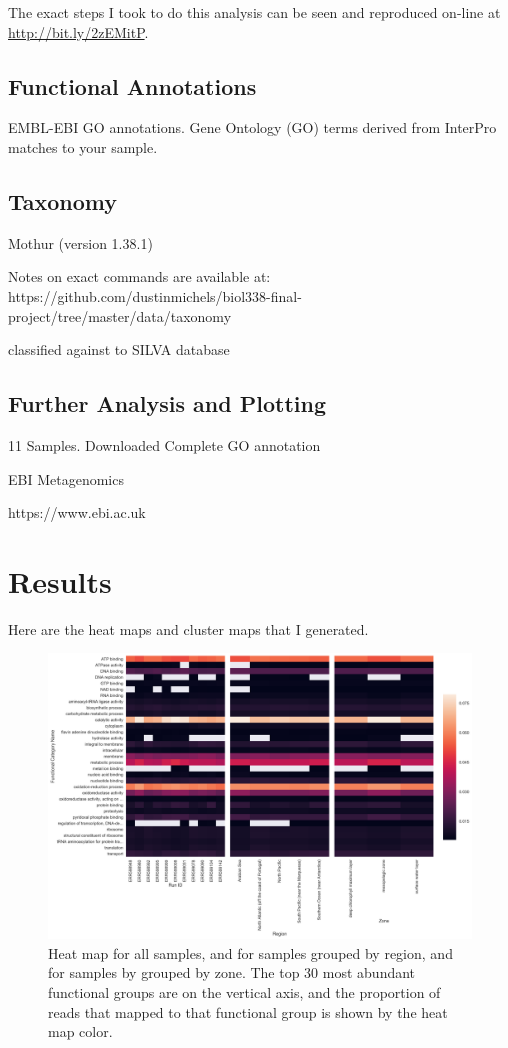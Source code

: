 \documentclass[12pt,a4paper,]{article}
\begin{document}
The exact steps I took to do this analysis can be seen and reproduced
on-line at \url{http://bit.ly/2zEMitP}.

\subsection{Functional Annotations}\label{functional-annotations}

EMBL-EBI GO annotations. Gene Ontology (GO) terms derived from InterPro
matches to your sample.

\subsection{Taxonomy}\label{taxonomy}

Mothur (version 1.38.1)

Notes on exact commands are available at:
https://github.com/dustinmichels/biol338-final-project/tree/master/data/taxonomy

classified against to SILVA database

\subsection{Further Analysis and
Plotting}\label{further-analysis-and-plotting}

11 Samples. Downloaded Complete GO annotation

EBI Metagenomics

https://www.ebi.ac.uk

\section{Results}\label{results}

Here are the heat maps and cluster maps that I generated.

\begin{figure}
\centering
\includegraphics{imgs/heat/heat_group.png}
\caption{Heat map for all samples, and for samples grouped by region,
and for samples by grouped by zone. The top 30 most abundant functional
groups are on the vertical axis, and the proportion of reads that mapped
to that functional group is shown by the heat map
color.\label{fig:heat_group}}
\end{figure}
\end{document}

